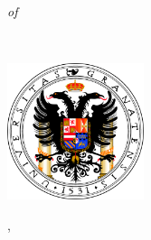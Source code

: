 \begin{titlepage}
    \begin{addmargin}[-1cm]{-3cm}
    \begin{center}
        \large

        \hfill

        \vfill 

        \begingroup
            {\color{Maroon}}

            \small{\emph{of}}
            \bigskip
        	
            {\color{Maroon}\spacedallcaps{\myTitle}}

			\small\mySubtitle \medskip  \medskip
            \\ \bigskip
        \endgroup

        \spacedlowsmallcaps{\myName}

        \vfill



		\includegraphics[width=4cm]{gfx/logo_ugr}
	

        \vfill

        \myProf, \myOtherProf \\
        \myUni \\ \bigskip

        \myTime\ %


    \end{center}
  \end{addmargin}
\end{titlepage}
